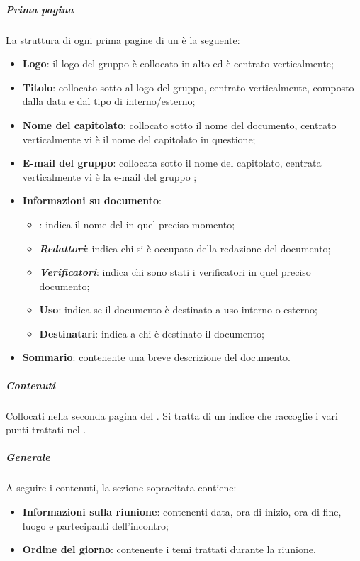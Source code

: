 \subparagraph{Prima pagina}
La struttura di ogni prima pagine di un \docNameVLow{} è la seguente:
\begin{itemize}
    \item \textbf{Logo}: il logo del gruppo \groupName{} è collocato in alto ed è centrato verticalmente;
    \item \textbf{Titolo}: collocato sotto al logo del gruppo, centrato verticalmente, composto dalla data e dal tipo di \docNameVLow{} interno/esterno;
    \item \textbf{Nome del capitolato}: collocato sotto il nome del documento, centrato verticalmente vi è il nome del capitolato in questione;
    \item \textbf{E-mail del gruppo}: collocata sotto il nome del capitolato, centrata verticalmente vi è la e-mail del gruppo \groupName{};
    \item \textbf{Informazioni su documento}:
          \begin{itemize}
              \item \textbf{\roleProjectManager{}}: indica il nome del \roleProjectManagerLow{} in quel preciso momento;
              \item \textbf{\textit{Redattori}}: indica chi si è occupato della redazione del documento;
              \item \textbf{\textit{Verificatori}}: indica chi sono stati i verificatori in quel preciso documento;
              \item \textbf{Uso}: indica se il documento è destinato a uso interno o esterno;
              \item \textbf{Destinatari}: indica a chi è destinato il documento;
          \end{itemize}
    \item \textbf{Sommario}: contenente una breve descrizione del documento.
          \end {itemize}

          \subparagraph*{Contenuti}
          Collocati nella seconda pagina del \docNameVLow{}. Si tratta di un indice che raccoglie i vari punti trattati nel \docNameVLow{}.

          \subparagraph*{Generale}
          A seguire i contenuti, la sezione sopracitata contiene:
          \begin {itemize}
    \item \textbf{Informazioni sulla riunione}: contenenti data, ora di inizio, ora di fine, luogo e partecipanti dell'incontro;
    \item \textbf{Ordine del giorno}: contenente i temi trattati durante la riunione.
          \end {itemize}

